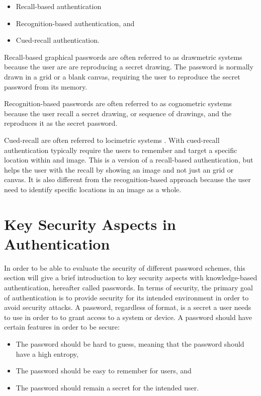       \begin{itemize}
        \item Recall-based authentication
        \item Recognition-based authentication, and 
        \item Cued-recall authentication.
      \end{itemize}

      Recall-based graphical passwords are often referred to as drawmetric systems \cite{DeAngeli} because the user are are reproducing a secret drawing. The password is normally drawn in a grid or a blank canvas, requiring the user to reproduce the secret password from its memory.

      Recognition-based passwords are often referred to as cognometric systems \cite{DeAngeli} because the user recall a secret drawing, or sequence of drawings, and the reproduces it as the secret password.

      Cued-recall are often referred to locimetric systems \cite{DeAngeli}. With cued-recall authentication typically require the users to remember and target a specific location within and image. This is a version of a recall-based authentication, but helps the user with the recall by showing an image and not just an grid or canvas. It is also different from the recognition-based approach because the user need to identify specific locations in an image as a whole. 

  \section{Key Security Aspects in Authentication}
  In order to be able to evaluate the security of different password schemes, this section will give a brief introduction to key security aspects with knowledge-based authentication, hereafter called passwords. In terms of security, the primary goal of authentication is to provide security for its intended environment in order to avoid security attacks. A password, regardless of format, is a secret a user needs to use in order to to grant access to a system or device. A password should have certain features in order to be secure:

    \begin{itemize}
      \item The password should be hard to guess, meaning that the password should have a high entropy,
      \item The password should be easy to remember for users, and 
      \item The password should remain a secret for the intended user.
    \end{itemize}


